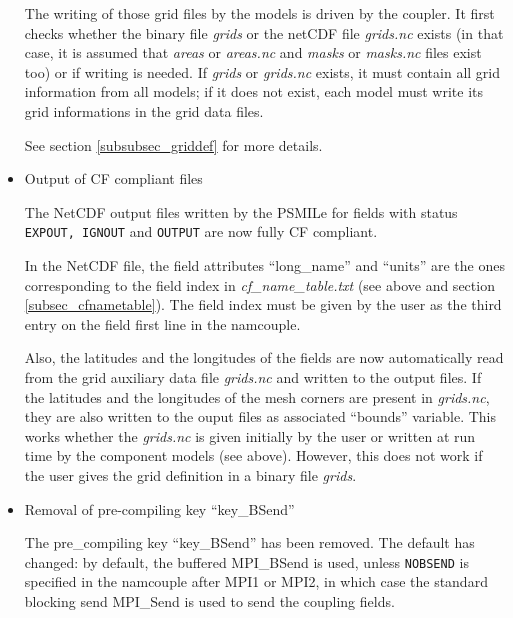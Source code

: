 \begin{itemize}
The writing of those grid files by the models is driven by the
coupler. It first checks whether the binary file {\em grids} or the
netCDF file {\em grids.nc} exists (in that case, it is assumed that
{\em areas} or {\em areas.nc} and {\em masks} or {\em masks.nc} files
exist too) or if writing is needed. If {\em grids} or {\em grids.nc}
exists, it must contain all grid information from all models; if it does not
exist, each model must write its grid informations in the grid data
files. 

See section \ref{subsubsec_griddef} for more details.

\item Output of CF compliant files

The NetCDF output files written by the PSMILe for fields with status
{\tt EXPOUT, IGNOUT} and {\tt OUTPUT} are now fully CF compliant.

In the NetCDF file, the field attributes ``long\_name'' and ``units''
are the ones corresponding to the field index in {\em
cf\_name\_table.txt} (see above and section
\ref{subsec_cfnametable}). The field index must be given by the user
as the third entry on the field first line in the namcouple.

Also, the latitudes and the longitudes of the fields are now
automatically read from the grid auxiliary data file {\em grids.nc} and
written to the output files. If the latitudes and the longitudes of
the mesh corners are present in {\em grids.nc}, they are also written to the
ouput files as associated ``bounds'' variable.  This works whether the
{\em grids.nc} is given initially by the user or written at run time by the
component models (see above). However, this does not work if the
user gives the grid definition in a binary file {\em grids}.

\item Removal of pre-compiling key ``key\_BSend''


The pre\_compiling key ``key\_BSend'' has been removed.  The default has
changed: by default, the buffered MPI\_BSend is used, unless {\tt NOBSEND}
is specified in the namcouple after MPI1 or MPI2, in which case the
standard blocking send MPI\_Send is used to send the coupling fields.

\end{itemize}



